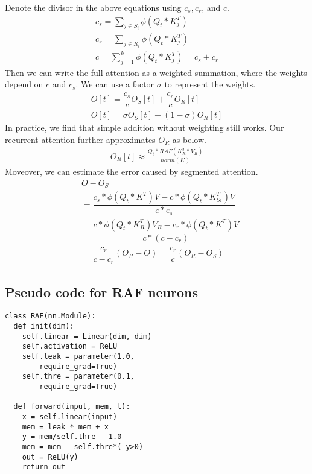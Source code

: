 \documentclass[11pt]{article}
\begin{document}
Denote the divisor in the above equations using $c_s, c_r$, and $c$. \begin{align*}
    c_{s}=\sum_{j\in S_i}\phi(Q_t*K_j^T)\\
    c_r= \sum_{j\in R_i}\phi(Q_t*K_j^T)\\
c=\sum_{j=1}^k\phi(Q_t*K_j^T)= c_s+c_r
\end{align*}
Then we can write the full attention as a weighted summation, where the weights depend on $c$ and $c_s$. We can use a factor $\sigma$ to represent the weights.
\begin{align*} 
O[t] = \dfrac{c_s}{c} O_S[t] + \dfrac{c_r}{c}O_R[t]\\
O[t] = \sigma O_S[t]  + (1- \sigma)  O_R[t] 
\end{align*}
In practice, we find that simple addition without weighting still works. Our recurrent attention further approximates $O_R$ as below. \begin{align*}
    O_R[t]   \approx   \frac{Q_t* RAF(K_R^T *V_R)} {norm(K)}
\end{align*}
Moveover, we can estimate the error caused by segmented attention.
\begin{align*}
&O-O_{S} \\&= \dfrac{c_s*\phi(Q_t*K^T)V  - c*\phi(Q_t*K_{Si}^T)V}{c*c_s}\\
  &  =\dfrac{c*\phi(Q_t*K_R^T)V_R  - c_r*\phi(Q_t*K^T)V}{c*(c-c_r)}\\
  &  = \dfrac{c_r}{c-c_r} (O_R -O) = \dfrac{c_r}{c} (O_R -O_S)
\end{align*} 
\subsection{Pseudo code for RAF neurons}
\label{RAFappendix}
\begin{lstlisting}
class RAF(nn.Module):
  def init(dim):
    self.linear = Linear(dim, dim)
    self.activation = ReLU
    self.leak = parameter(1.0,
        require_grad=True)
    self.thre = parameter(0.1,
        require_grad=True)
    
  def forward(input, mem, t):
    x = self.linear(input)
    mem = leak * mem + x
    y = mem/self.thre - 1.0 
    mem = mem - self.thre*( y>0)
    out = ReLU(y)
    return out
\end{lstlisting}
\end{document}
